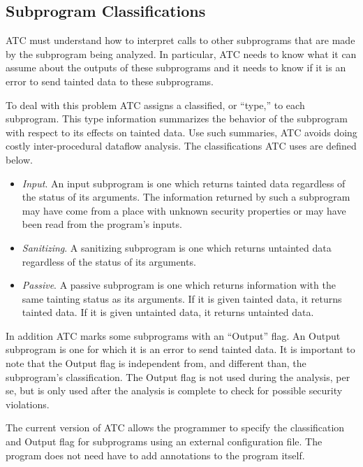 \documentclass{article}
\begin{document}
\subsection{Subprogram Classifications}

ATC must understand how to interpret calls to other subprograms that are made by the subprogram being analyzed. In particular, ATC needs to know what it can assume about the outputs of these subprograms and it needs to know if it is an error to send tainted data to these subprograms.

To deal with this problem ATC assigns a classified, or ``type,'' to each subprogram. This type information summarizes the behavior of the subprogram with respect to its effects on tainted data. Use such summaries, ATC avoids doing costly inter-procedural dataflow analysis. The classifications ATC uses are defined below.

\begin{itemize}

\item \textit{Input}. An input subprogram is one which returns tainted data regardless of the status of its arguments. The information returned by such a subprogram may have come from a place with unknown security properties or may have been read from the program's inputs.

\item \textit{Sanitizing}. A sanitizing subprogram is one which returns untainted data regardless of the status of its arguments.

\item \textit{Passive}. A passive subprogram is one which returns information with the same tainting status as its arguments. If it is given tainted data, it returns tainted data. If it is given untainted data, it returns untainted data.

\end{itemize}

In addition ATC marks some subprograms with an ``Output'' flag. An Output subprogram is one for which it is an error to send tainted data. It is important to note that the Output flag is independent from, and different than, the subprogram's classification. The Output flag is not used during the analysis, per se, but is only used after the analysis is complete to check for possible security violations.

The current version of ATC allows the programmer to specify the classification and Output flag for subprograms using an external configuration file. The program does not need have to add annotations to the program itself.
\end{document}
